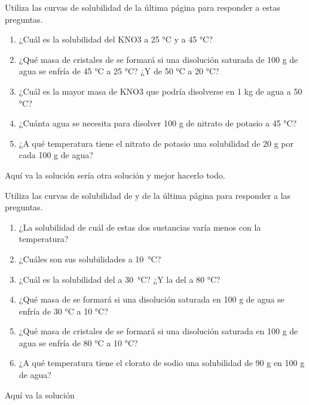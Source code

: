 \begin{exercise}
    Utiliza las curvas de solubilidad de la última página para responder a estas preguntas.
    \begin{enumerate}[label=\letraminuscula]
            \item ¿Cuál es la solubilidad del KNO3 a 25 °C y a 45 °C?
            \item ¿Qué masa de cristales de  se formará si una disolución saturada de 100 g de agua se enfría de 45 °C a 25 °C? ¿Y de 50 °C a 20 °C?
            \item ¿Cuál es la mayor masa de KNO3 que podría disolverse en 1 kg de agua a 50 °C?
            \item ¿Cuánta agua se necesita para disolver 100 g de nitrato de potasio a 45 °C?
            \item ¿A qué temperatura tiene el nitrato de potasio una solubilidad de 20 g por cada 100 g de agua?
    \end{enumerate}
    \begin{solu}
        Aquí va la solución sería otra solución y mejor hacerlo todo.
    \end{solu}
\end{exercise}

\begin{exercise}
    Utiliza las curvas de solubilidad de  y  de la última página para responder a las preguntas.
    \begin{enumerate}[label=\letraminuscula]
            \item ¿La solubilidad de cuál de estas dos sustancias varía menos con la temperatura?
            \item ¿Cuáles son sus solubilidades a \qty{10}{\celsius}?
            \item ¿Cuál es la solubilidad del  a \qty{30}{\celsius}? ¿Y la del  a 80 °C?
            \item ¿Qué masa de  se formará si una disolución saturada en 100 g de agua se enfría de
            30 °C a 10 °C?
            \item ¿Qué masa de cristales de  se formará si una disolución saturada en 100 g de agua se enfría
            de 80 °C a 10 °C?
            \item ¿A qué temperatura tiene el clorato de sodio una solubilidad de 90 g en 100 g de agua?
    \end{enumerate}
    \begin{solu}
        Aquí va la solución
    \end{solu}
\end{exercise}

